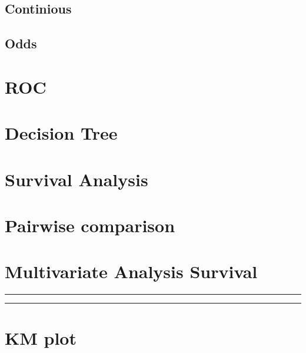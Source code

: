 \documentclass[]{article}
\begin{document}
\hypertarget{continious}{%
\subsection{Continious}\label{continious}}

\hypertarget{odds}{%
\subsection{Odds}\label{odds}}

\newpage
\begin{landscape}

\hypertarget{roc}{%
\section{ROC}\label{roc}}

\hypertarget{decision-tree}{%
\section{Decision Tree}\label{decision-tree}}

\hypertarget{survival-analysis}{%
\section{Survival Analysis}\label{survival-analysis}}

\hypertarget{pairwise-comparison}{%
\section{Pairwise comparison}\label{pairwise-comparison}}

\hypertarget{multivariate-analysis-survival}{%
\section{Multivariate Analysis
Survival}\label{multivariate-analysis-survival}}

\begin{center}\rule{0.5\linewidth}{\linethickness}\end{center}

\begin{center}\rule{0.5\linewidth}{\linethickness}\end{center}

\hypertarget{km-plot}{%
\section{KM plot}\label{km-plot}}


\end{landscape}
\end{document}
